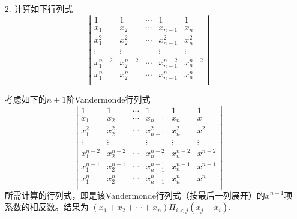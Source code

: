 \begin{itemize}
    \item[2.] 计算如下行列式
    \begin{equation}
    \nonumber
    \left|
        \begin{array}{ccccc}
        1       &1       &\cdots &1 & 1\\
        x_1     &x_2     &\cdots &x_{n-1} & x_n\\
        x_1^2   &x_2^2   &\cdots &x_{n-1}^2 & x_n^2\\
        \vdots  &\vdots  &       &\vdots & \vdots\\
        x_1^{n-2} &x_2^{n-2}     &\cdots &x_{n-1}^{n-2} & x_n^{n-2}\\
        x_1^{n} &x_2^{n}     &\cdots &x_{n-1}^{n} & x_n^{n}\\
        \end{array}
    \right|
    \end{equation} 
	\begin{solution}
	考虑如下的$n+1$阶Vandermonde行列式
	\begin{equation}
    \nonumber
    \left|
        \begin{array}{cccccc}
        1       &1       &\cdots &1 & 1& 1\\
        x_1     &x_2     &\cdots &x_{n-1} & x_n & x\\
        x_1^2   &x_2^2   &\cdots &x_{n-1}^2 & x_n^2 & x^2\\
        \vdots  &\vdots  &       &\vdots & \vdots & \vdots\\
        x_1^{n-2} &x_2^{n-2}     &\cdots &x_{n-1}^{n-2} & x_n^{n-2} & x^{n-2}\\
        x_1^{n-1} &x_2^{n-1}     &\cdots &x_{n-1}^{n-1} & x_n^{n-1} & x^{n-1}\\
        x_1^{n} &x_2^{n}     &\cdots &x_{n-1}^{n} & x_n^{n} & x^n\\
        \end{array}
    \right|
    \end{equation}
	所需计算的行列式，即是该Vandermonde行列式（按最后一列展开）的$x^{n-1}$项系数的相反数。结果为
	$(x_1 + x_2 + \cdots + x_n)\Pi_{i<j}(x_j-x_i)$.
	\end{solution}
	\vspace{2cm}
\end{itemize}